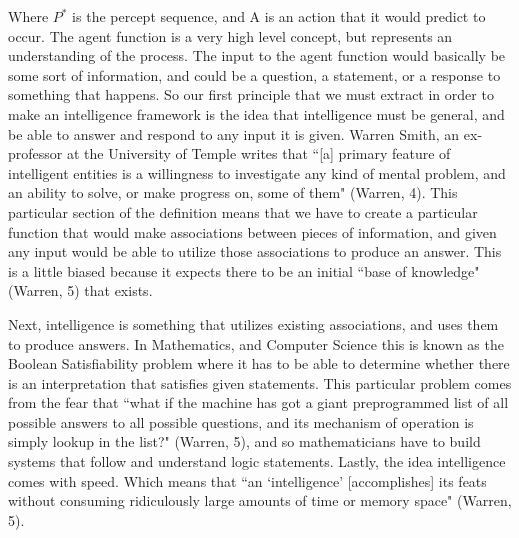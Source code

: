 \documentclass[11pt, oneside]{article}
\begin{document}
\noindent Where $P^*$ is the percept sequence, and A is an action that it would predict to occur. The agent function is a very high level concept, but represents an understanding of the process. The input to the agent function would basically be some sort of information, and could be a question, a statement, or a response to something that happens. So our first principle that we must extract in order to make an intelligence framework is the idea that intelligence must be general, and be able to answer and respond to any input it is given. Warren Smith, an ex-professor at the University of Temple writes that ``[a] primary feature of intelligent entities is a willingness to investigate any kind of mental problem, and an ability to solve, or make progress on, some of them" (Warren, 4). This particular section of the definition means that we have to create a particular function that would make associations between pieces of information, and given any input would be able to utilize those associations to produce an answer. This is a little biased because it expects there to be an initial ``base of knowledge" (Warren, 5) that exists. 

\par Next, intelligence is something that utilizes existing associations, and uses them to produce answers. In Mathematics, and Computer Science this is known as the Boolean Satisfiability problem where it has to be able to determine whether there is an interpretation that satisfies given statements. This particular problem comes from the fear that ``what if the machine has got a giant preprogrammed list of all possible answers to all possible questions, and its mechanism of operation is simply lookup in the list?" (Warren, 5), and so mathematicians have to build systems that follow and understand logic statements. Lastly, the idea intelligence comes with speed. Which means that ``an `intelligence' [accomplishes] its feats without consuming ridiculously large amounts of time or memory space" (Warren, 5). 
\end{document}
